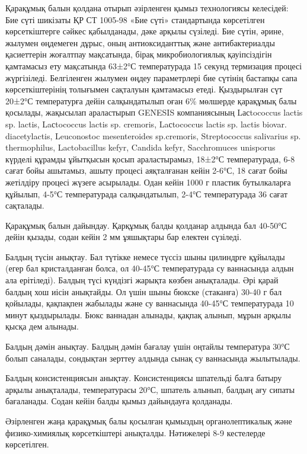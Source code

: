 Қарақұмық балын қолдана отырып әзірленген қымыз технологиясы келесідей:
Бие сүті шикізаты ҚР СТ 1005-98 «Бие сүті» стандартында көрсетілген
көрсеткіштерге сәйкес қабылданады, дәке арқылы сүзіледі. Бие сүтін,
әрине, жылумен өңдемеген дұрыс, оның антиоксиданттық және
антибактериалды қасиеттерін жоғалтпау мақсатында, бірақ микробиологиялық
қауіпсіздігін қамтамасыз ету мақсатында 63±2°С температурада 15 секунд
термизация процесі жүргізіледі. Белгіленген жылумен өңдеу параметрлері
бие сүтінің бастапқы сапа көрсеткіштерінің толығымен сақталуын
қамтамасыз етеді. Қыздырылған сүт 20±2°С температурға дейін
салқындатылып оған 6\% мөлшерде қарақұмық балы қосылады, жақысылап
араластырып GENESIS компаниясының Lасtococcus lactis sp. lactis,
Laсtococcus lactis sp. cremoris, Laсtococcus lactis sp. lactis biovar.
diacetylactis, Leuconostoc mesenteroides sp.cremoris, Streptococcus
salivarius sp. thermophilus, Lactobacillus kefyr, Candida kefyr,
Sacchromuces unisporus күрделі құрамды ұйытқысын қосып араластырамыз,
18±2°С температурада, 6-8 сағат бойы ашытамыз, ашыту процесі аяқталғанан
кейін 2-6°С, 18 сағат бойы жетілдіру процесі жүзеге асырылады. Одан
кейін 1000 г пластик бутылкаларға құйылып, 4-5°С температурада
салқындатылып, 2-4°С температурада 36 сағат сақталады.

Қарақұмық балын дайындау. Қарқұмық балды қолданар алдында бал 40-50°С
дейін қызады, содан кейін 2 мм ұяшықтары бар електен сүзіледі.

Балдың түсін анықтау. Бал түтікке немесе түссіз шыны цилиндрге құйылады
(егер бал кристалданған болса, ол 40-45°С температурада су ваннасында
алдын ала ерітіледі). Балдың түсі күндізгі жарықта көзбен анықталады.
Әрі қарай балдың хош иісін анықтайды. Ол үшін шыны бюкске (стаканға)
30-40 г бал қойылады, қақпақпен жабылады және су ваннасында 40-45°С
температурада 10 минут қыздырылады. Бюкс ваннадан алынады, қақпақ
алынып, мұрын арқылы қысқа дем алынады.

Балдың дәмін анықтау. Балдың дәмін бағалау үшін оңтайлы температура 30°С
болып саналады, сондықтан зерттеу алдында сынақ су ваннасында
жылытылады.

Балдың консистенциясын анықтау. Консистенциясы шпательді балға батыру
арқылы анықталады, температурасы 20°С, шпатель алынып, балдың ағу сипаты
бағаланады. Содан кейін балды қымыз дайындауға қолданады.

Әзірленген жаңа қарақұмық балы қосылған қымыздың органолептикалық және
физико-химиялық көрсеткіштері анықталды. Нәтижелері 8-9 кестелерде
көрсетілген.


